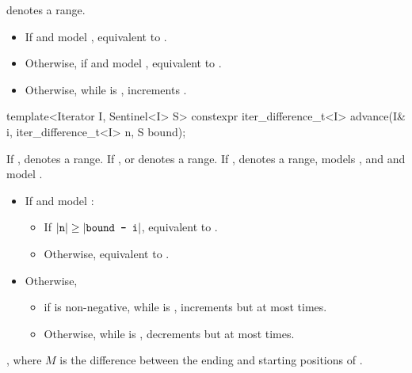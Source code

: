 \begin{itemdescr}
\pnum
\expects
{} denotes a range.

\pnum
\effects
\begin{itemize}
\item If  and  model ,
  equivalent to .
\item Otherwise, if  and  model ,
  equivalent to .
\item Otherwise, while  is ,
  increments .
\end{itemize}
\end{itemdescr}

%
\begin{itemdecl}
template<Iterator I, Sentinel<I> S>
  constexpr iter_difference_t<I> advance(I& i, iter_difference_t<I> n, S bound);
\end{itemdecl}

\begin{itemdescr}
\pnum
\expects
If ,  denotes a range.
If ,  or  denotes a range.
If ,  denotes a range,
 models , and
 and  model .

\pnum
\effects
\begin{itemize}
\item If  and  model :
  \begin{itemize}
  \item If \brk{}$|\texttt{n}| \ge |\texttt{bound - i}|$,
    equivalent to .
  \item Otherwise, equivalent to .
  \end{itemize}
\item Otherwise,
  \begin{itemize}
  \item if  is non-negative,
    while  is ,
    increments  but at most  times.
  \item Otherwise,
    while  is ,
    decrements  but at most  times.
  \end{itemize}
\end{itemize}

\pnum
\returns
{}, where $M$ is the difference between
the ending and starting positions of .
\end{itemdescr}

